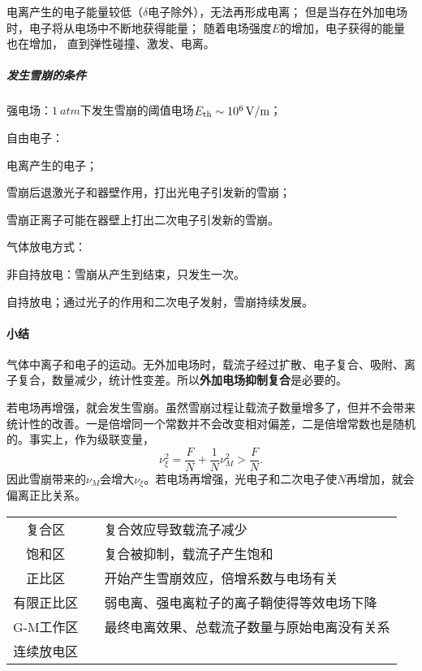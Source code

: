 电离产生的电子能量较低（$\delta$电子除外），无法再形成电离；
但是当存在外加电场时，电子将从电场中不断地获得能量；
随着电场强度$E$的增加，电子获得的能量也在增加，%
直到弹性碰撞、激发、电离。
\subparagraph{发生雪崩的条件}
\begin{compactenum}
	\item 强电场：$\SI{1}{atm}$下发生雪崩的阈值电场$E_{\mathrm{th}}\sim\SI{e6}{V/m}$；
	\item 自由电子：
	\begin{compactenum}
		\item 电离产生的电子；
		\item 雪崩后退激光子和器壁作用，打出光电子引发新的雪崩；
		\item 雪崩正离子可能在器壁上打出二次电子引发新的雪崩。
	\end{compactenum}
\end{compactenum}
气体放电方式：
\begin{compactitem}
	\item 非自持放电：雪崩从产生到结束，只发生一次。
	\item 自持放电；通过光子的作用和二次电子发射，雪崩持续发展。
\end{compactitem}
\paragraph{小结}气体中离子和电子的运动。无外加电场时，载流子经过扩散、电子复合、吸附、离子复合，数量减少，统计性变差。所以\textbf{外加电场抑制复合}是必要的。

若电场再增强，就会发生雪崩。虽然雪崩过程让载流子数量增多了，但并不会带来统计性的改善。一是倍增同一个常数并不会改变相对偏差，二是倍增常数也是随机的。事实上，作为级联变量，
\[
	\nu_\xi^2=\frac FN+\frac1N\nu_M^2>\frac FN.
\]
因此雪崩带来的$\nu_M$会增大$\nu_\xi$。若电场再增强，光电子和二次电子使$N$再增加，就会偏离正比关系。
\newpage
\begin{center}
	\begin{tabular}{ccl}
		\toprule
		复合区&&复合效应导致载流子减少\\
		饱和区&\checkmark&复合被抑制，载流子产生饱和\\
		正比区&\checkmark&开始产生雪崩效应，倍增系数与电场有关\\
		有限正比区&&弱电离、强电离粒子的离子鞘使得等效电场下降\\
		G-M工作区&\checkmark&最终电离效果、总载流子数量与原始电离没有关系\\
		连续放电区\\
		\bottomrule
	\end{tabular}
\end{center}

